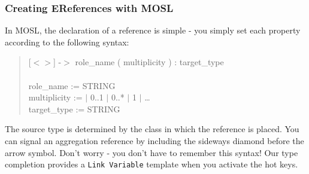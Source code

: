 \newpage
\subsubsection{Creating EReferences with MOSL}
\texHeader
\hypertarget{static:references tex}{}

In MOSL, the declaration of a reference is simple - you simply set each property according to the following syntax:

{ \begin{quote} \small
[$<>$] -$>$ role\_name ( multiplicity ) :  target\_type \\
\\
role\_name := STRING \\
multiplicity := $|$ 0..1 $|$ 0..* $|$ 1 $|$ \ldots \\
target\_type := STRING \\
\end{quote} }

The source type is determined by the class in which the reference is placed. You can signal an aggregation reference by including the sideways diamond before
the arrow symbol. Don't worry - you don't have to remember this syntax! Our type completion provides a \texttt{Link Variable} template when you activate the hot
keys.

